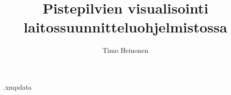 \begin{filecontents*}{\jobname.xmpdata}
\end{filecontents*}
\documentclass{wihuri}
\usepackage[utf8]{inputenc} %
\usepackage[T1]{fontenc}      %
\usepackage[finnish]{babel} %
\usepackage{tytiivis} %
\usepackage{graphicx}%
\usepackage{xcolor}
\usepackage{lastpage}
\usepackage{subfiles}
\usepackage{url}
\usepackage{tikz}
\usepackage{tikz-3dplot}
\usepackage[a-1b]{pdfx}  %
\usepackage[pdfa]{hyperref} %
%
\newcommand{\mathbi}[1]{\textbf{\em #1}}
\newcommand{\der}{\mbox{d}}
%

\newcommand{\engl}[1]{\emph{(engl. #1)}}


\title{Pistepilvien visualisointi laitossuunnitteluohjelmistossa}
\author{Timo Heinonen}
\maketitle
\newpage
\thispagestyle{empty}
\vspace*{10cm}

\vfill

\hspace*{-2cm}\parbox{\textwidth}{Turun yliopiston laatujärjestelmän mukaisesti
  tämän julkaisun alkuperäisyys on tarkastettu Turnitin
  OriginalityCheck-järjestelmällä} 


